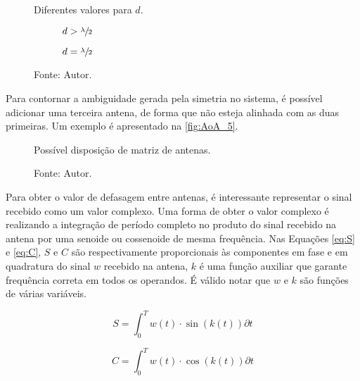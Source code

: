 \begin{figure}
    \caption{Diferentes valores para $d$.}
    \label{fig:AoA_d}

    \hfill
    \begin{subfigure}[b]{0.45\textwidth}
        \centering
        \caption{$d > \sfrac{\lambda}{2}$}
        
        \label{fig:AoA_d:fail}
    \end{subfigure}
    \hfill
    \begin{subfigure}[b]{0.45\textwidth}
        \centering
        \caption{$d = \sfrac{\lambda}{2}$}
        
        \label{fig:AoA_d:ok}
    \end{subfigure}
    \hfill

    \caption*{Fonte: Autor.}
\end{figure}

Para contornar a ambiguidade gerada pela simetria no sistema, é possível adicionar uma terceira antena, de forma que não esteja alinhada com as duas primeiras.
Um exemplo é apresentado na \autoref{fig:AoA_5}.

\begin{figure}[htbp]
    \centering
    \caption{Possível disposição de matriz de antenas.}
    
    \caption*{Fonte: Autor.}
    \label{fig:AoA_5}
\end{figure}

Para obter o valor de defasagem entre antenas, é interessante representar o sinal recebido como um valor complexo.
Uma forma de obter o valor complexo é realizando a integração de período completo no produto do sinal recebido na antena por uma senoide ou cossenoide de mesma frequência.
Nas Equações \ref{eq:S} e \ref{eq:C}, $S$ e $C$ são respectivamente proporcionais às componentes em fase e em quadratura do sinal $w$ recebido na antena, $k$ é uma função auxiliar que garante frequência correta em todos os operandos.
É válido notar que $w$ e $k$ são funções de várias variáveis.

\begin{equation}\label{eq:S}
    S = \int_0^T w(t) \cdot \sin(k(t)) \partial t
\end{equation}

\begin{equation}\label{eq:C}
    C = \int_0^T w(t) \cdot \cos(k(t)) \partial t
\end{equation}

